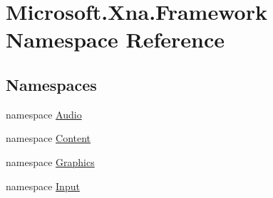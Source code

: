 \hypertarget{namespaceMicrosoft_1_1Xna_1_1Framework}{}\section{Microsoft.\+Xna.\+Framework Namespace Reference}
\label{namespaceMicrosoft_1_1Xna_1_1Framework}
\subsection*{Namespaces}
\begin{DoxyCompactItemize}
\item 
namespace \hyperlink{namespaceMicrosoft_1_1Xna_1_1Framework_1_1Audio}{Audio}
\item 
namespace \hyperlink{namespaceMicrosoft_1_1Xna_1_1Framework_1_1Content}{Content}
\item 
namespace \hyperlink{namespaceMicrosoft_1_1Xna_1_1Framework_1_1Graphics}{Graphics}
\item 
namespace \hyperlink{namespaceMicrosoft_1_1Xna_1_1Framework_1_1Input}{Input}
\end{DoxyCompactItemize}
